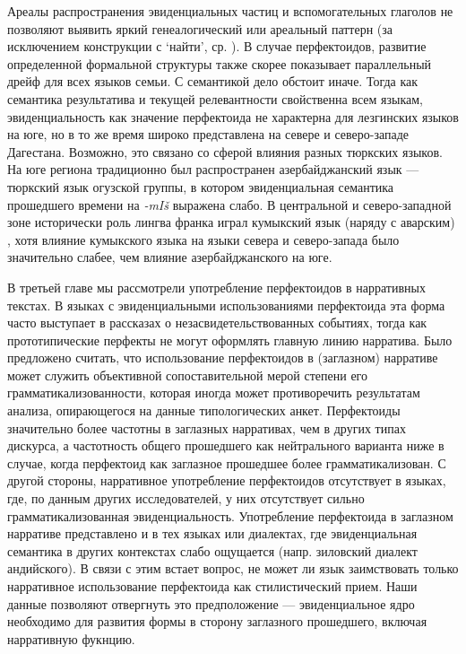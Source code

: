 \par Ареалы распространения эвиденциальных частиц и вспомогательных глаголов не позволяют выявить яркий генеалогический или ареальный паттерн (за исключением конструкции с `найти', ср. \citep{danielmaisak2018}). В случае перфектоидов, развитие определенной формальной структуры также скорее показывает параллельный дрейф для всех языков семьи. С семантикой дело обстоит иначе. Тогда как семантика результатива и текущей релевантности свойственна всем языкам, эвиденциальность как значение перфектоида не характерна для лезгинских языков на юге, но в то же время широко представлена на севере и северо-западе Дагестана. Возможно, это связано со сферой влияния разных тюркских языков. На юге региона традиционно был распространен азербайджанский язык --- тюркский язык огузской группы, в котором эвиденциальная семантика прошедшего времени на \textit{-mIš} выражена слабо\citep{johanson2018}. В центральной и северо-западной зоне исторически роль лингва франка играл кумыкский язык (наряду с аварским) \citep{chirikba2008}, хотя влияние кумыкского языка на языки севера и северо-запада было значительно слабее, чем влияние азербайджанского на юге.
\par В третьей главе мы рассмотрели употребление перфектоидов в нарративных текстах. В языках с эвиденциальными использованиями перфектоида эта форма часто выступает в рассказах о незасвидетельствованных событиях, тогда как прототипические перфекты не могут оформлять главную линию нарратива. Было предложено считать, что использование перфектоидов в (заглазном) нарративе может служить объективной сопоставительной мерой степени его грамматикализованности, которая иногда может противоречить результатам анализа, опирающегося на данные типологических анкет. Перфектоиды значительно более частотны в заглазных нарративах, чем в других типах дискурса, а частотность общего прошедшего как нейтрального варианта ниже в случае, когда перфектоид как заглазное прошедшее более грамматикализован. С другой стороны, нарративное употребление перфектоидов отсутствует в языках, где, по данным других исследователей, у них отсутствует сильно грамматикализованная эвиденциальность. 
Употребление перфектоида в заглазном нарративе представлено и в тех языках или диалектах, где эвиденциальная семантика в других контекстах слабо ощущается (напр. зиловский диалект андийского). В связи с этим встает вопрос, не может ли язык заимствовать только нарративное использование перфектоида как стилистический прием. Наши данные позволяют отвергнуть это предположение --- эвиденциальное ядро необходимо для развития формы в сторону заглазного прошедшего, включая нарративную фукнцию.
